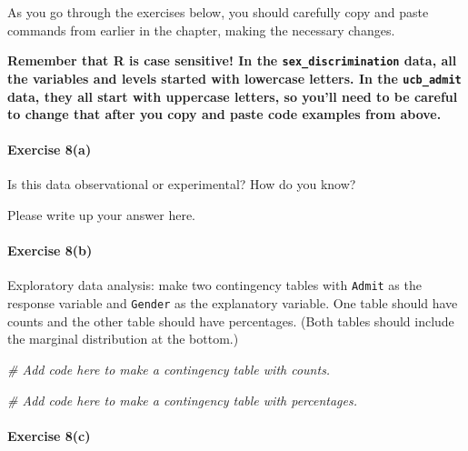 \documentclass[
]{book}
\newenvironment{Shaded}{\begin{snugshade}}{\end{snugshade}}
\newcommand{\CommentTok}[1]{\textcolor[rgb]{0.56,0.35,0.01}{\textit{#1}}}
\begin{document}
As you go through the exercises below, you should carefully copy and paste commands from earlier in the chapter, making the necessary changes.

\textbf{Remember that R is case sensitive! In the \texttt{sex\_discrimination} data, all the variables and levels started with lowercase letters. In the \texttt{ucb\_admit} data, they all start with uppercase letters, so you'll need to be careful to change that after you copy and paste code examples from above.}

\hypertarget{exercise-8a-2}{%
\paragraph*{Exercise 8(a)}\label{exercise-8a-2}}

Is this data observational or experimental? How do you know?

Please write up your answer here.

\hypertarget{exercise-8b-2}{%
\paragraph*{Exercise 8(b)}\label{exercise-8b-2}}

Exploratory data analysis: make two contingency tables with \texttt{Admit} as the response variable and \texttt{Gender} as the explanatory variable. One table should have counts and the other table should have percentages. (Both tables should include the marginal distribution at the bottom.)

\begin{Shaded}
\begin{Highlighting}[]
\CommentTok{\# Add code here to make a contingency table with counts.}
\end{Highlighting}
\end{Shaded}

\begin{Shaded}
\begin{Highlighting}[]
\CommentTok{\# Add code here to make a contingency table with percentages.}
\end{Highlighting}
\end{Shaded}

\hypertarget{exercise-8c}{%
\paragraph*{Exercise 8(c)}\label{exercise-8c}}
\end{document}
